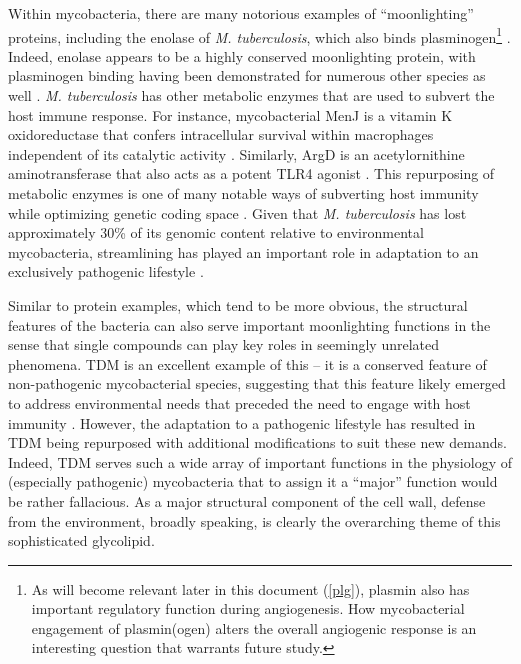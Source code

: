 Within mycobacteria, there are many notorious examples of ``moonlighting'' proteins, including the enolase of \textit{M. tuberculosis}, which also binds plasminogen\footnote{As will become relevant later in this document (\autoref{plg}), plasmin also has important regulatory function during angiogenesis. How mycobacterial engagement of plasmin(ogen) alters the overall angiogenic response is an interesting question that warrants future study.} \citep{Rahi2017}. Indeed, enolase appears to be a highly conserved moonlighting protein, with plasminogen binding having been demonstrated for numerous other species as well \citep{Figueiredo2015, Seweryn2007, Candela2009, Floden2011, Vanegas2007, Agarwal2008}. \textit{M. tuberculosis} has other metabolic enzymes that are used to subvert the host immune response. For instance, mycobacterial MenJ is a vitamin K oxidoreductase that confers intracellular survival within macrophages independent of its catalytic activity \citep{Kumar2020b}. Similarly, ArgD is an acetylornithine aminotransferase that also acts as a potent TLR4 agonist \citep{Nehvi2022}. This repurposing of metabolic enzymes is one of many notable ways of subverting host immunity while optimizing genetic coding space \citep{Banerjee2004, Banerjee2007, Henderson2010}. Given that \textit{M. tuberculosis} has lost approximately 30\% of its genomic content relative to environmental mycobacteria, streamlining has played an important role in adaptation to an exclusively pathogenic lifestyle \citep{Stinear2008}. 

Similar to protein examples, which tend to be more obvious, the structural features of the bacteria can also serve important moonlighting functions in the sense that single compounds can play key roles in seemingly unrelated phenomena. TDM is an excellent example of this -- it is a conserved feature of non\hyp{}pathogenic mycobacterial species, suggesting that this feature likely emerged to address environmental needs that preceded the need to engage with host immunity \citep{Kremer2002, Pacheco2013}. However, the adaptation to a pathogenic lifestyle has resulted in TDM being repurposed with additional modifications to suit these new demands. Indeed, TDM serves such a wide array of important functions in the physiology of (especially pathogenic) mycobacteria that to assign it a ``major'' function would be rather fallacious. As a major structural component of the cell wall, defense from the environment, broadly speaking, is clearly the overarching theme of this sophisticated glycolipid. 

